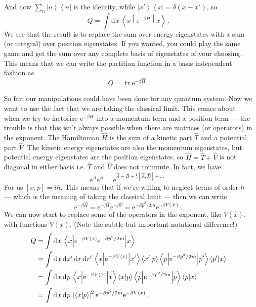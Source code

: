 \documentclass{article}
\theoremstyle{plain}\theoremheaderfont{\normalfont\bfseries}\theorembodyfont{\rmfamily}\theoremseparator{.}\newtheorem*{thm}{Theorem}\newtheorem*{law}{Law}\newtheorem*{pos}{Postulate}
\numberwithin{equation}{section}
\newcommand{\ee}{\mathrm{e}}
\newcommand{\dd}[2][]{\mathrm{d}^{#1} #2\,}
\newcommand{\bra}[1]{\left\langle #1 \right|}
\newcommand{\ket}[1]{\left| #1 \right\rangle}
\newcommand{\braket}[2]{\left\langle #1 \middle| #2 \right\rangle}
\newcommand{\mel}[3]{\left\langle #1 \middle| #2 \middle| #3 \right\rangle}
\newcommand{\expval}[2]{\left\langle #2 \middle| #1 \middle| #2 \right\rangle}
\newcommand{\abs}[1]{\left| #1 \right|}
\DeclareMathOperator{\tr}{tr}
\begin{document}
    And now \(\sum_n\ket{n}\bra{n}\) is the identity, while \(\ket{x'}\bra{x}=\delta(x-x')\), so
    \begin{equation}
        Q=\int\dd{x}\expval{\ee^{-\beta\hat{H}}}{x}\,.
    \end{equation}
    We see that the result is to replace the sum over energy eigenstates with a sum (or integral) over position eigenstates. If you wanted, you could play the same game and get the sum over any complete basis of eigenstates of your choosing. This means that we can write the partition function in a basis independent fashion as
    \begin{equation}
        Q=\tr \ee^{-\beta\hat{H}}\,.
    \end{equation}

    So far, our manipulations could have been done for any quantum system. Now we want to use the fact that we are taking the classical limit. This comes about when we try to factorize \(\ee^{-\beta H}\) into a momentum term and a position term --- the trouble is that this isn't always possible when there are matrices (or operators) in the exponent. The Hamiltonian \(\hat{H}\) is the sum of a kinetic part \(\hat{T}\) and a potential part \(\hat{V}\).  The kinetic energy eigenstates are also the momentum eigenstates, but potential energy eigenstates are the position eigenstates, so \(\hat{H}=\hat{T}+\hat{V}\) is not diagonal in either basis i.e. \(\hat{T}\) and \(\hat{V}\) does not commute. In fact, we have
    \begin{equation}
        \ee^{\hat{A}}\ee^{\hat{B}}=\ee^{\hat{A}+\hat{B}+\frac{1}{2}[\hat{A},\hat{B}]+\dots}\,.
    \end{equation}
    For us \([x,p]=i\hbar\). This means that if we're willing to neglect terms of order \(\hbar\) --- which is the meaning of taking the classical limit --- then we can write
    \begin{equation}
        \ee^{-\beta\hat{H}}=\ee^{-\beta \hat{T}}\ee^{-\beta \hat{V}}=\ee^{-\beta\hat{p}^2/2m}\ee^{-\beta V(\hat{x})}\,.
    \end{equation}
    We can now start to replace some of the operators in the exponent, like \(V(\hat{x})\), with functions \(V(x)\). (Note the subtle but important notational difference!)
    \begin{align}
        Q&=\int\dd{x}\expval{\ee^{-\beta V(\hat{x})}\ee^{-\beta\hat{p}^2/2m}}{x}\notag\\
        &=\int\dd{x}\dd{x'}\dd{r}\dd{r'}\mel{x}{\ee^{-\beta\hat{V}(\hat{x})}}{x'}\braket{x'}{p}\mel{p}{\ee^{-\beta\hat{p}^2/2m}}{p'}\braket{p'}{x}\notag \\
        &=\int\dd{x}\dd{p}\mel{x}{\ee^{-\beta\hat{V}(\hat{x})}}{x}\braket{x}{p}\mel{p}{\ee^{-\beta\hat{p}^2/2m}}{p}\braket{p}{x}\notag \\
        &=\int\dd{x}\dd{p}\abs{\braket{x}{p}}^2 \ee^{-\beta p^2/2m}\ee^{-\beta V(x)}\,,
    \end{align}
\end{document}
